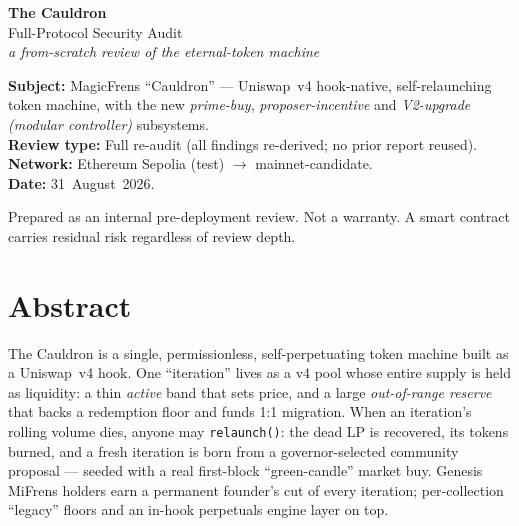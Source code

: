 \documentclass[11pt]{article}
\begin{document}
\begin{titlepage}
\centering
\vspace*{2.2cm}
{\Huge\bfseries\color{void} The Cauldron}\\[0.35cm]
{\LARGE\color{violet} Full-Protocol Security Audit}\\[0.2cm]
{\large\itshape a from-scratch review of the eternal-token machine}\\[1.4cm]

\begin{tcolorbox}[colback=codebg,colframe=violet,width=0.8\textwidth,arc=3pt]
\centering
\textbf{Subject:} MagicFrens ``Cauldron'' — Uniswap~v4 hook-native, self-relaunching
token machine, with the new \emph{prime-buy}, \emph{proposer-incentive} and
\emph{V2-upgrade (modular controller)} subsystems.\\[0.4cm]
\textbf{Review type:} Full re-audit (all findings re-derived; no prior report reused).\\[0.2cm]
\textbf{Network:} Ethereum Sepolia (test) $\rightarrow$ mainnet-candidate.\\[0.2cm]
\textbf{Date:} 31~August~2026.
\end{tcolorbox}

\vfill
{\small\color{sevInfo} Prepared as an internal pre-deployment review. Not a warranty.
A smart contract carries residual risk regardless of review depth.}
\end{titlepage}

\tableofcontents
\newpage

\section{Abstract}

The Cauldron is a single, permissionless, self-perpetuating token machine built as a
Uniswap~v4 hook. One ``iteration'' lives as a v4 pool whose entire supply is held as
liquidity: a thin \emph{active} band that sets price, and a large \emph{out-of-range
reserve} that backs a redemption floor and funds 1:1 migration. When an iteration's
rolling volume dies, anyone may \texttt{relaunch()}: the dead LP is recovered, its tokens
burned, and a fresh iteration is born from a governor-selected community proposal — seeded
with a real first-block ``green-candle'' market buy. Genesis MiFrens holders earn a
permanent founder's cut of every iteration; per-collection ``legacy'' floors and an
in-hook perpetuals engine layer on top.
\end{document}
